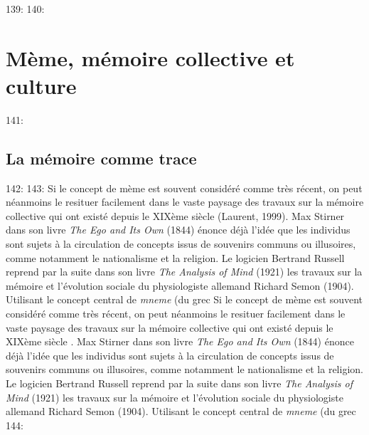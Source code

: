 139: 
140: \section[M\`eme, m\'emoire collective et culture]{M\`eme, m\'emoire collective et culture}
141: \subsection[La m\'emoire comme trace]{La m\'emoire comme trace}
142: 
143: Si le concept de m\`eme est souvent consid\'er\'e comme tr\`es r\'ecent, on peut n\'eanmoins le resituer facilement dans le vaste paysage des travaux sur la m\'emoire collective qui ont exist\'e depuis le XIX\`eme si\`ecle (Laurent, 1999). Max Stirner dans son livre \textit{The Ego and Its Own }(1844) \'enonce d\'ej\`a l{\textquoteright}id\'ee que les individus sont sujets \`a la circulation de concepts issus de souvenirs communs ou illusoires, comme notamment le nationalisme et la religion. Le logicien Bertrand Russell reprend par la suite dans son livre \textit{The Analysis of Mind }(1921) les travaux sur la m\'emoire et l{\textquoteright}\'evolution sociale du physiologiste allemand Richard Semon (1904). Utilisant le concept central de \textit{mneme} (du grec 
Si le concept de m\`eme est souvent consid\'er\'e comme tr\`es r\'ecent, on peut n\'eanmoins le resituer facilement dans le vaste paysage des travaux sur la m\'emoire collective qui ont exist\'e depuis le XIX\`eme si\`ecle \cite{Laurent1999}. Max Stirner dans son livre \textit{The Ego and Its Own }(1844) \'enonce d\'ej\`a l{\textquoteright}id\'ee que les individus sont sujets \`a la circulation de concepts issus de souvenirs communs ou illusoires, comme notamment le nationalisme et la religion. Le logicien Bertrand Russell reprend par la suite dans son livre \textit{The Analysis of Mind }(1921) les travaux sur la m\'emoire et l{\textquoteright}\'evolution sociale du physiologiste allemand Richard Semon (1904). Utilisant le concept central de \textit{mneme} (du grec 
144: %
